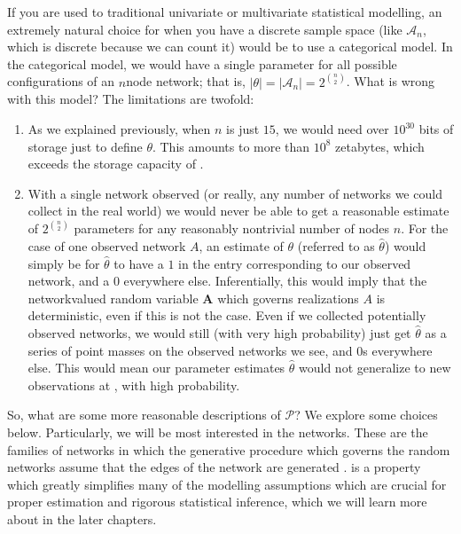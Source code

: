 \documentclass[letterpaper,10pt,english]{jupyterBook}
\begin{document}
\sphinxAtStartPar
If you are used to traditional univariate or multivariate statistical modelling, an extremely natural choice for when you have a discrete sample space (like \(\mathcal A_n\), which is discrete because we can count it) would be to use a categorical model. In the categorical model, we would have a single parameter for all possible configurations of an \(n\)\sphinxhyphen{}node network; that is, \(|\theta| = \left|\mathcal A_n\right| = 2^{\binom n 2}\). What is wrong with this model? The limitations are two\sphinxhyphen{}fold:
\begin{enumerate}
%
\item {} 
\sphinxAtStartPar
As we explained previously, when \(n\) is just \(15\), we would need over \(10^{30}\) bits of storage just to define \(\theta\). This amounts to more than \(10^{8}\) zetabytes, which exceeds the storage capacity of .

\item {} 
\sphinxAtStartPar
With a single network observed (or really, any number of networks we could collect in the real world) we would never be able to get a reasonable estimate of \(2^{\binom n 2}\) parameters for any reasonably non\sphinxhyphen{}trivial number of nodes \(n\). For the case of one observed network \(A\), an estimate of \(\theta\) (referred to as \(\hat\theta\)) would simply be for \(\hat\theta\) to have a \(1\) in the entry corresponding to our observed network, and a \(0\) everywhere else. Inferentially, this would imply that the network\sphinxhyphen{}valued random variable \(\mathbf A\) which governs realizations \(A\) is deterministic, even if this is not the case. Even if we collected potentially  observed networks, we would still (with very high probability) just get \(\hat \theta\) as a series of point masses on the observed networks we see, and \(0\)s everywhere else. This would mean our parameter estimates \(\hat\theta\) would not generalize to new observations at , with high probability.

\end{enumerate}

\sphinxAtStartPar
So, what are some more reasonable descriptions of \(\mathcal P\)? We explore some choices below. Particularly, we will be most interested in the  networks. These are the families of networks in which the generative procedure which governs the random networks assume that the edges of the network are generated .  is a property which greatly simplifies many of the modelling assumptions which are crucial for proper estimation and rigorous statistical inference, which we will learn more about in the later chapters.
\end{document}
